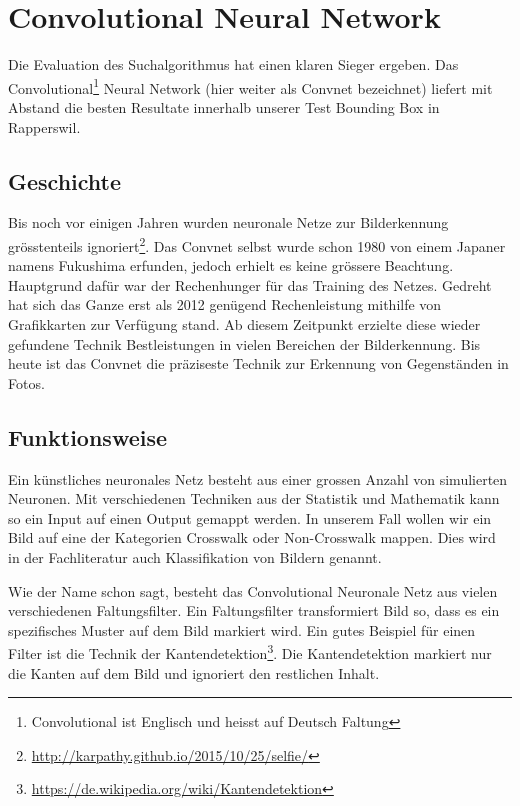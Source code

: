 \section{Convolutional Neural Network}
Die Evaluation des Suchalgorithmus hat einen klaren Sieger ergeben. Das Convolutional\footnote{Convolutional ist Englisch und heisst auf Deutsch Faltung} Neural Network (hier weiter als Convnet bezeichnet) liefert mit Abstand die besten Resultate innerhalb unserer Test Bounding Box in Rapperswil.

\subsection{Geschichte}
Bis noch vor einigen Jahren wurden neuronale Netze zur Bilderkennung grösstenteils ignoriert\footnote{\url{http://karpathy.github.io/2015/10/25/selfie/}}. Das Convnet selbst wurde schon 1980 von einem Japaner namens Fukushima erfunden, jedoch erhielt es keine grössere Beachtung. Hauptgrund dafür war der Rechenhunger für das Training des Netzes. Gedreht hat sich das Ganze erst als 2012 genügend Rechenleistung mithilfe von Grafikkarten zur Verfügung stand. Ab diesem Zeitpunkt erzielte diese wieder gefundene Technik Bestleistungen in vielen Bereichen der Bilderkennung. Bis heute ist das Convnet die präziseste Technik zur Erkennung von Gegenständen in Fotos.

\subsection{Funktionsweise}
Ein künstliches neuronales Netz besteht aus einer grossen Anzahl von simulierten Neuronen. Mit verschiedenen Techniken aus der Statistik und  Mathematik kann so ein Input auf einen Output gemappt werden. In unserem Fall wollen wir ein Bild auf eine der Kategorien Crosswalk oder Non-Crosswalk mappen. Dies wird in der Fachliteratur auch Klassifikation von Bildern genannt.

Wie der Name schon sagt, besteht das Convolutional Neuronale Netz aus vielen verschiedenen Faltungsfilter. Ein Faltungsfilter transformiert Bild so, dass es ein spezifisches Muster auf dem Bild markiert wird. Ein gutes Beispiel für einen Filter ist die Technik der Kantendetektion\footnote{\url{https://de.wikipedia.org/wiki/Kantendetektion}}. Die Kantendetektion markiert nur die Kanten auf dem Bild und ignoriert den restlichen Inhalt.

